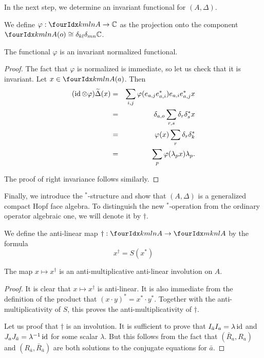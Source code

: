 In the next step, we determine an invariant functional for $(A,\Delta)$.

\begin{Def} We define $\varphi: \Gr{A}{k}{l}{m}{n} \rightarrow \C$ as the projection onto the component $\Gr{A}{k}{l}{m}{n}(o) \cong \delta_{kl}\delta_{mn} \C$.
\end{Def}

\begin{Lem} The functional $\varphi$ is an invariant normalized functional.
\end{Lem}

\begin{proof} The fact that $\varphi$ is normalized is immediate, so let us check that it is invariant. Let $x\in \Gr{A}{k}{l}{m}{n}(a)$. Then \begin{eqnarray*} (\operatorname{id}\otimes \varphi)\widetilde{\Delta}(x) &=& \sum_{i,j}  \varphi(e_{a,j}e_{a,i}^*)e_{a,i}e_{a,j}^*x \\ &=& \delta_{a,o} \sum_{r,s}\delta_r\delta_s^* x \\ &=& \varphi(x)\sum_r\delta_r\delta_k^*  \\ &=& \sum_p\varphi(\lambda_px)\lambda_p.\end{eqnarray*}

The proof of right invariance follows similarly.
\end{proof}

Finally, we introduce the $^*$-structure and show that $(A,\Delta)$ is a generalized compact Hopf face algebra. To distinguish the new $^*$-operation from the ordinary operator algebraic one, we will denote it by $\dagger$.

\begin{Def} We define the anti-linear map $\dagger: \Gr{A}{k}{l}{m}{n} \rightarrow \Gr{A}{m}{n}{k}{l}$ by the formula \[ x^{\dagger} = S(x^*) \]
\end{Def}

\begin{Lem} The map $x\mapsto x^{\dagger}$ is an anti-multiplicative anti-linear involution on $A$.
\end{Lem}

\begin{proof} It is clear that $x\mapsto x^{\dagger}$ is anti-linear. It is also immediate from the definition of the product that $(x\cdot y)^* = x^*\cdot y^*$. Together with the anti-multiplicativity of $S$, this proves the anti-multiplicativity of $\dagger$.

Let us proof that $\dagger$ is an involution. It is sufficient to prove that $I_{\bar{a}}I_a= \lambda\operatorname{id}$ and $J_aJ_{\bar{a}} = \lambda^{-1}\operatorname{id}$ for some scalar $\lambda$. But this follows from the fact that $(\bar{R}_a,R_a)$ and $(R_{\bar{a}},\bar{R}_{\bar{a}})$ are both solutions to the conjugate equations for $\bar{a}$.
\end{proof}

